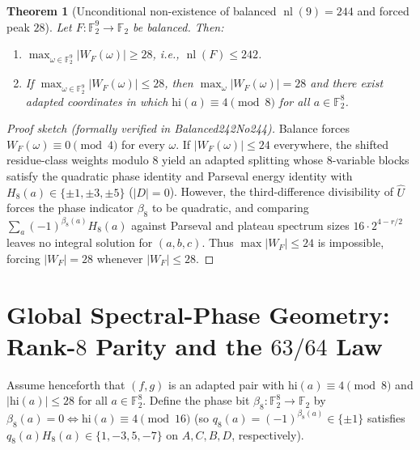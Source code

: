 \documentclass[11pt]{article}
\newtheorem{theorem}{Theorem}[section]
\theoremstyle{definition}
\newcommand{\F}{\mathbb{F}}
\newcommand{\nl}{\operatorname{nl}}
\newcommand{\code}[1]{{\ttfamily\small\renewcommand{\_}{\textunderscore\allowbreak}#1}}
\begin{document}
\begin{theorem}[Unconditional non-existence of balanced $\nl(9) = 244$ and forced peak $28$]
\label{thm:no244}
Let $F : \F_2^9 \to \F_2$ be balanced. Then:
\begin{enumerate}[nosep]
  \item $\max_{\omega \in \F_2^9} |W_F(\omega)| \ge 28$, i.e., $\nl(F) \le 242$.
  \item If $\max_{\omega \in \F_2^9} |W_F(\omega)| \le 28$, then $\max_{\omega} |W_F(\omega)| = 28$ and there exist adapted coordinates in which $\mathrm{hi}(a) \equiv 4 \pmod 8$ for all $a \in \F_2^8$.
\end{enumerate}
\end{theorem}
\begin{proof}[Proof sketch (formally verified in \code{Balanced242No244})]
Balance forces $W_F(\omega) \equiv 0 \pmod 4$ for every $\omega$. If $|W_F(\omega)| \le 24$ everywhere, the shifted residue-class weights modulo $8$ yield an adapted splitting whose $8$-variable blocks satisfy the quadratic phase identity and Parseval energy identity with $H_8(a) \in \{\pm 1, \pm 3, \pm 5\}$ ($|D| = 0$). However, the third-difference divisibility of $\widehat{U}$ forces the phase indicator $\beta_8$ to be quadratic, and comparing $\sum_a (-1)^{\beta_8(a)} H_8(a)$ against Parseval and plateau spectrum sizes $16 \cdot 2^{4-r/2}$ leaves no integral solution for $(a, b, c)$. Thus $\max |W_F| \le 24$ is impossible, forcing $|W_F| = 28$ whenever $|W_F| \le 28$.
\end{proof}

\section{Global Spectral-Phase Geometry: Rank-$8$ Parity and the $63/64$ Law}
\label{sec:phase-geometry}

Assume henceforth that $(f, g)$ is an adapted pair with $\mathrm{hi}(a) \equiv 4 \pmod 8$ and $|\mathrm{hi}(a)| \le 28$ for all $a \in \F_2^8$.
Define the phase bit $\beta_8 : \F_2^8 \to \F_2$ by $\beta_8(a) = 0 \iff \mathrm{hi}(a) \equiv 4 \pmod{16}$ (so $q_8(a) = (-1)^{\beta_8(a)} \in \{\pm 1\}$ satisfies $q_8(a) H_8(a) \in \{1, -3, 5, -7\}$ on $A, C, B, D$, respectively).
\end{document}
